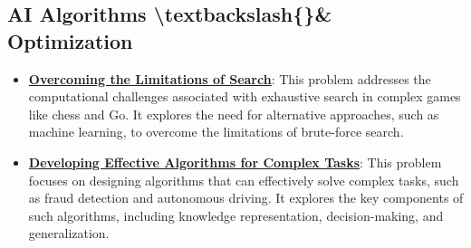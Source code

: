 \documentclass{article}%
\begin{document}
\subsection{AI Algorithms \textbackslash{}textbackslash\{\}\& Optimization}%
\label{subsec:AIAlgorithmstextbackslashOptimization}%
\begin{itemize}[leftmargin=*]%
\item \href{https://purdue.brightspace.com/d2l/common/assets/pdfjs-d2l-dist/1.0.14-legacy/web/viewer.html?file=\%2Fcontent\%2Fenforced\%2F1095467-wl.202510.CS.24300.001\%2F02L2-Intro.pdf\%3Fou\%3D1095467\&lang=en-us\&container=d2l-fileviewer-rendered-pdf\&fullscreen=d2l-fileviewer-rendered-pdf-dialog\&height=667#page=11}{\textbf{Overcoming the Limitations of Search}}: This problem addresses the computational challenges associated with exhaustive search in complex games like chess and Go. It explores the need for alternative approaches, such as machine learning, to overcome the limitations of brute{-}force search.%
\item \href{https://purdue.brightspace.com/d2l/common/assets/pdfjs-d2l-dist/1.0.14-legacy/web/viewer.html?file=\%2Fcontent\%2Fenforced\%2F1095467-wl.202510.CS.24300.001\%2F02L2-Intro.pdf\%3Fou\%3D1095467\&lang=en-us\&container=d2l-fileviewer-rendered-pdf\&fullscreen=d2l-fileviewer-rendered-pdf-dialog\&height=667#page=36}{\textbf{Developing Effective Algorithms for Complex Tasks}}: This problem focuses on designing algorithms that can effectively solve complex tasks, such as fraud detection and autonomous driving. It explores the key components of such algorithms, including knowledge representation, decision{-}making, and generalization.%
\end{itemize}

%
\end{document}
